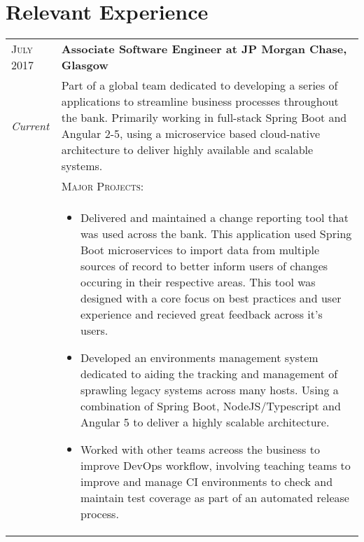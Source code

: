\section{Relevant Experience}

\begin{tabular}{p{60pt}|p{11cm}}
	\hspace*{\fill}\textsc{July 2017} & \textbf{Associate Software Engineer at JP Morgan Chase, Glasgow} \\
	
	\hspace*{\fill}\emph{Current}& \small{
		Part of a global team dedicated to developing a series of applications to streamline business processes throughout the bank. Primarily working in full-stack Spring Boot and Angular 2-5, using a microservice based cloud-native architecture to deliver highly available and scalable systems.
	} \\

	\ & \vspace{1pt}\textsc{Major Projects}: \\

	&\vspace{-0.9em}\begin{itemize}[itemsep=0pt,topsep=0pt,leftmargin=*]\small
		\item Delivered and maintained a change reporting tool that was used across the bank. This application used Spring Boot microservices to import data from multiple sources of record to better inform users of changes occuring in their respective areas. This tool was designed with a core focus on best practices and user experience and recieved great feedback across it's users. 
		\item Developed an environments management system dedicated to aiding the tracking and management of sprawling legacy systems across many hosts. Using a combination of Spring Boot, NodeJS/Typescript and Angular 5 to deliver a highly scalable architecture.
		\item Worked with other teams acreoss the business to improve DevOps workflow, involving teaching teams to improve and manage CI environments to check and maintain test coverage as part of an automated release process.
	\end{itemize}\vspace{-1.5em}

\end{tabular} \\ \\ \\
